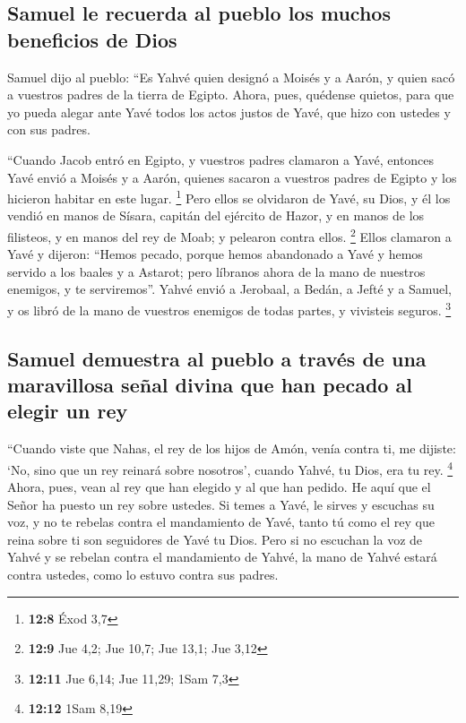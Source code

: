 \begin{paracol}{2}
\hypertarget{samuel-le-recuerda-al-pueblo-los-muchos-beneficios-de-dios}{%
\subsection{Samuel le recuerda al pueblo los muchos beneficios de
Dios}\label{samuel-le-recuerda-al-pueblo-los-muchos-beneficios-de-dios}}

 Samuel dijo al pueblo: ``Es Yahvé quien designó a Moisés
y a Aarón, y quien sacó a vuestros padres de la tierra de Egipto.
 Ahora, pues, quédense quietos, para que yo pueda alegar
ante Yavé todos los actos justos de Yavé, que hizo con ustedes y con sus
padres.

 ``Cuando Jacob entró en Egipto, y vuestros padres
clamaron a Yavé, entonces Yavé envió a Moisés y a Aarón, quienes sacaron
a vuestros padres de Egipto y los hicieron habitar en este lugar.
\footnote{\textbf{12:8} Éxod 3,7}  Pero ellos se olvidaron
de Yavé, su Dios, y él los vendió en manos de Sísara, capitán del
ejército de Hazor, y en manos de los filisteos, y en manos del rey de
Moab; y pelearon contra ellos. \footnote{\textbf{12:9} Jue 4,2; Jue
  10,7; Jue 13,1; Jue 3,12}  Ellos clamaron a Yavé y
dijeron: ``Hemos pecado, porque hemos abandonado a Yavé y hemos servido
a los baales y a Astarot; pero líbranos ahora de la mano de nuestros
enemigos, y te serviremos''.  Yahvé envió a Jerobaal, a
Bedán, a Jefté y a Samuel, y os libró de la mano de vuestros enemigos de
todas partes, y vivisteis seguros. \footnote{\textbf{12:11} Jue 6,14;
  Jue 11,29; 1Sam 7,3}

\hypertarget{samuel-demuestra-al-pueblo-a-travuxe9s-de-una-maravillosa-seuxf1al-divina-que-han-pecado-al-elegir-un-rey}{%
\subsection{Samuel demuestra al pueblo a través de una maravillosa señal
divina que han pecado al elegir un
rey}\label{samuel-demuestra-al-pueblo-a-travuxe9s-de-una-maravillosa-seuxf1al-divina-que-han-pecado-al-elegir-un-rey}}

 ``Cuando viste que Nahas, el rey de los hijos de Amón,
venía contra ti, me dijiste: `No, sino que un rey reinará sobre
nosotros', cuando Yahvé, tu Dios, era tu rey. \footnote{\textbf{12:12}
  1Sam 8,19}  Ahora, pues, vean al rey que han elegido y
al que han pedido. He aquí que el Señor ha puesto un rey sobre ustedes.
 Si temes a Yavé, le sirves y escuchas su voz, y no te
rebelas contra el mandamiento de Yavé, tanto tú como el rey que reina
sobre ti son seguidores de Yavé tu Dios.  Pero si no
escuchan la voz de Yahvé y se rebelan contra el mandamiento de Yahvé, la
mano de Yahvé estará contra ustedes, como lo estuvo contra sus padres.


\end{paracol}
